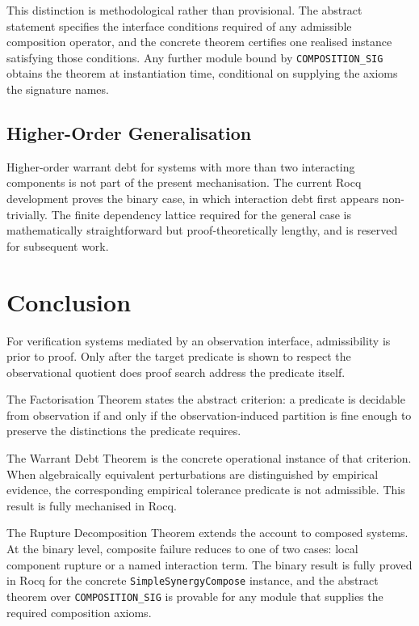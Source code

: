 \documentclass[pdflatex,sn-mathphys-num]{sn-jnl}
\theoremstyle{plain}
\theoremstyle{definition}
\theoremstyle{remark}
\begin{document}
This distinction is methodological rather than provisional.
The abstract statement specifies the interface conditions required of
any admissible composition operator, and the concrete theorem
certifies one realised instance satisfying those conditions.
Any further module bound by \texttt{COMPOSITION\_SIG} obtains the
theorem at instantiation time, conditional on supplying the axioms the
signature names.

\subsection{Higher-Order Generalisation}

Higher-order warrant debt for systems with more than two interacting
components is not part of the present mechanisation.
The current Rocq development proves the binary case, in which
interaction debt first appears non-trivially.
The finite dependency lattice required for the general case is
mathematically straightforward but proof-theoretically lengthy, and is
reserved for subsequent work.

\section{Conclusion}
\label{sec:conclusion}

For verification systems mediated by an observation interface,
admissibility is prior to proof.
Only after the target predicate is shown to respect the observational
quotient does proof search address the predicate itself.

The Factorisation Theorem states the abstract criterion: a predicate
is decidable from observation if and only if the observation-induced
partition is fine enough to preserve the distinctions the predicate
requires.

The Warrant Debt Theorem is the concrete operational instance of that
criterion.
When algebraically equivalent perturbations are distinguished by
empirical evidence, the corresponding empirical tolerance predicate is
not admissible.
This result is fully mechanised in Rocq.

The Rupture Decomposition Theorem extends the account to composed
systems.
At the binary level, composite failure reduces to one of two cases:
local component rupture or a named interaction term.
The binary result is fully proved in Rocq for the concrete
\texttt{SimpleSynergyCompose} instance, and the abstract theorem over
\texttt{COMPOSITION\_SIG} is provable for any module that supplies
the required composition axioms.
\end{document}
